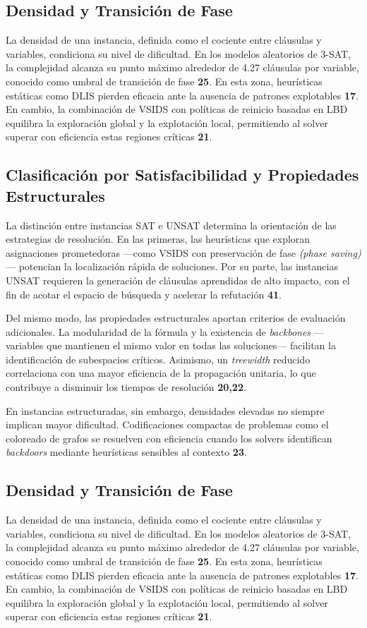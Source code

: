 \subsection{Densidad y Transición de Fase}
La densidad de una instancia, definida como el cociente entre cláusulas y variables, condiciona su nivel de dificultad. En los modelos aleatorios de 3-SAT, la complejidad alcanza su punto máximo alrededor de 4.27 cláusulas por variable, conocido como umbral de transición de fase \textbf{25}. En esta zona, heurísticas estáticas como DLIS pierden eficacia ante la ausencia de patrones explotables \textbf{17}. En cambio, la combinación de VSIDS con políticas de reinicio basadas en LBD equilibra la exploración global y la explotación local, permitiendo al solver superar con eficiencia estas regiones críticas \textbf{21}.

\subsection{Clasificación por Satisfacibilidad y Propiedades Estructurales}
La distinción entre instancias SAT e UNSAT determina la orientación de las estrategias de resolución. En las primeras, las heurísticas que exploran asignaciones prometedoras —como VSIDS con preservación de fase \textit{(phase saving)}— potencian la localización rápida de soluciones. Por su parte, las instancias UNSAT requieren la generación de cláusulas aprendidas de alto impacto, con el fin de acotar el espacio de búsqueda y acelerar la refutación \textbf{41}.

Del mismo modo, las propiedades estructurales aportan criterios de evaluación adicionales. La modularidad de la fórmula y la existencia de \textit{backbones} —variables que mantienen el mismo valor en todas las soluciones— facilitan la identificación de subespacios críticos. Asimismo, un \textit{treewidth} reducido correlaciona con una mayor eficiencia de la propagación unitaria, lo que contribuye a disminuir los tiempos de resolución \textbf{20,22}.

En instancias estructuradas, sin embargo, densidades elevadas no siempre implican mayor dificultad. Codificaciones compactas de problemas como el coloreado de grafos se resuelven con eficiencia cuando los solvers identifican \textit{backdoors} mediante heurísticas sensibles al contexto \textbf{23}.

\subsection{Densidad y Transición de Fase}
La densidad de una instancia, definida como el cociente entre cláusulas y variables, condiciona su nivel de dificultad. En los modelos aleatorios de 3-SAT, la complejidad alcanza su punto máximo alrededor de 4.27 cláusulas por variable, conocido como umbral de transición de fase \textbf{25}. En esta zona, heurísticas estáticas como DLIS pierden eficacia ante la ausencia de patrones explotables \textbf{17}. En cambio, la combinación de VSIDS con políticas de reinicio basadas en LBD equilibra la exploración global y la explotación local, permitiendo al solver superar con eficiencia estas regiones críticas \textbf{21}.

